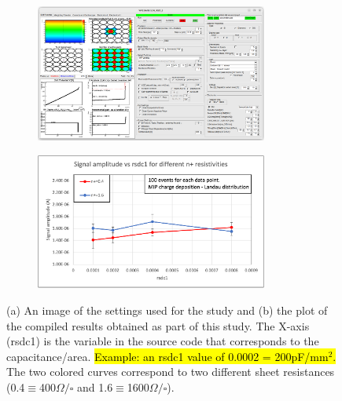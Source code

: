\documentclass[11pt]{article}
\newcommand{\hlyellow}[1]{{\sethlcolor{yellow}\hl{#1}}}
\begin{document}
\begin{figure}[h!]
    \centering
    \begin{subfigure}[t]{0.49\textwidth}
        \centering
        \includegraphics[width=3in]{Images/recreate_kita_amp_vs_ccp_other_settings.png}
        \caption{}
        \label{fig:recreate_kita_amp_vs_ccp_other_settings}
    \end{subfigure}%
    \begin{subfigure}[t]{0.49\textwidth}
        \centering
        \includegraphics[width=3in]{Images/recreate_kita_amp_vs_ccp_plot.png}
        \caption{}
        \label{fig:recreate_kita_amp_vs_ccp_plot}
    \end{subfigure}
    \caption{(a) An image of the settings used for the study and (b) the plot of the compiled results obtained as part of this study. The X-axis (rsdc1) is the variable in the source code that corresponds to the capacitance/area. \hlyellow{Example: an rsdc1 value of 0.0002 = 200pF/mm$^2$.} The two colored curves correspond to two different sheet resistances (0.4$\equiv$400$\Omega/\square$ and 1.6$\equiv$1600$\Omega/\square$).}
    \label{fig:recreate_kita_amp_vs_ccp}
\end{figure}

\end{document}
